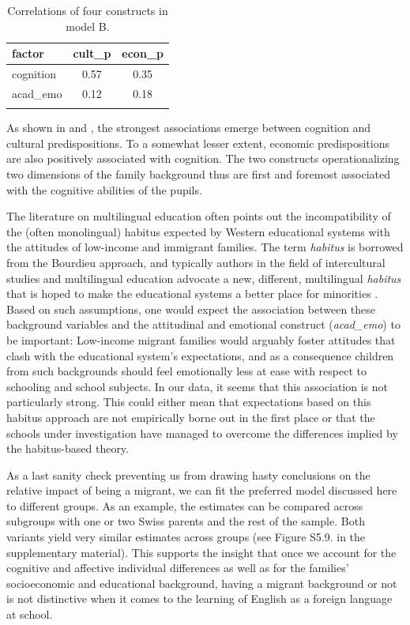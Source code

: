 \documentclass[output=paper]{langsci/langscibook}
\begin{document}
\begin{table}
\caption{Correlations of four constructs in model B.\label{tab:05:3}}
\begin{tabular}{lcc}
\lsptoprule
factor & cult\_p & econ\_p\\\midrule
cognition & 0.57 & 0.35\\
acad\_emo & 0.12 & 0.18\\
\lspbottomrule
\end{tabular}
\end{table}



As shown in  and , the strongest associations emerge between cognition and cultural predispositions. To a somewhat lesser extent, economic predispositions are also positively associated with cognition. The two constructs operationalizing two dimensions of the family background thus are first and foremost associated with the cognitive abilities of the pupils. 

The literature on multilingual education often points out the incompatibility of the (often monolingual) habitus expected by Western educational systems with the attitudes of low-income and immigrant families. The term \textit{habitus} is borrowed from the Bourdieu approach, and typically authors in the field of intercultural studies and multilingual education advocate a new, different, multilingual \textit{habitus} that is hoped to make the educational systems a better place for minorities \citep{Gogolin1994}. Based on such assumptions, one would expect the association between these background variables and the attitudinal and emotional construct (\textit{acad\_emo}) to be important: Low-income migrant families would arguably foster attitudes that clash with the educational system’s expectations, and as a consequence children from such backgrounds should feel emotionally less at ease with respect to schooling and school subjects. In our data, it seems that this association is not particularly strong. This could either mean that expectations based on this habitus approach are not empirically borne out in the first place or that the schools under investigation have managed to overcome the differences implied by the habitus-based theory.

As a last sanity check preventing us from drawing hasty conclusions on the relative impact of being a migrant, we can fit the preferred model discussed here to different groups. As an example, the estimates can be compared across subgroups with one or two Swiss parents and the rest of the sample. Both variants yield very similar estimates across groups (see Figure S5.9. in the supplementary material). This supports the insight that once we account for the cognitive and affective individual differences as well as for the families’ socioeconomic and educational background, having a migrant background or not is not distinctive when it comes to the learning of English as a foreign language at school.
\end{document}
